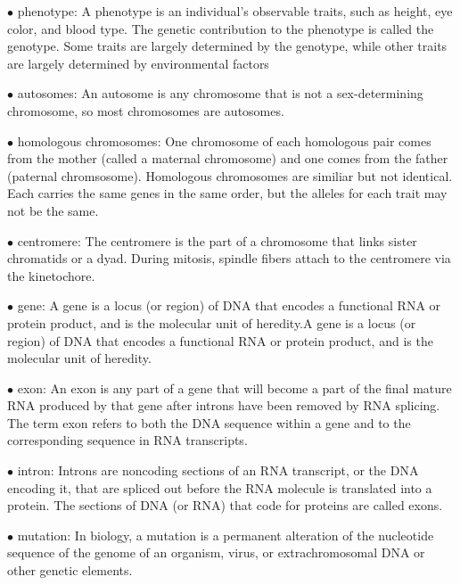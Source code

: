 \documentclass{article}
\begin{document}
\vspace{0.1in}
$\bullet$ phenotype:
A phenotype is an individual's observable traits, such as height, eye color, and blood type. The genetic contribution to the phenotype is called the genotype. Some traits are largely determined by the genotype, while other traits are largely determined by environmental factors

\vspace{0.1in}
$\bullet$ autosomes:
An autosome is any chromosome that is not a sex-determining chromosome, so most chromosomes are autosomes.

\vspace{0.1in}
$\bullet$ homologous chromosomes:
One chromosome of each homologous pair comes from the mother (called a maternal chromosome) and one comes from the father (paternal chromsosome). Homologous chromosomes are similiar but not identical. Each carries the same genes in the same order, but the alleles for each trait may not be the same.

\vspace{0.1in}
$\bullet$ centromere:
The centromere is the part of a chromosome that links sister chromatids or a dyad. During mitosis, spindle fibers attach to the centromere via the kinetochore. 

\vspace{0.1in}
$\bullet$ gene:
A gene is a locus (or region) of DNA that encodes a functional RNA or protein product, and is the molecular unit of heredity.A gene is a locus (or region) of DNA that encodes a functional RNA or protein product, and is the molecular unit of heredity.

\vspace{0.1in}
$\bullet$ exon:
An exon is any part of a gene that will become a part of the final mature RNA produced by that gene after introns have been removed by RNA splicing. The term exon refers to both the DNA sequence within a gene and to the corresponding sequence in RNA transcripts.

\vspace{0.1in}
$\bullet$ intron:
Introns are noncoding sections of an RNA transcript, or the DNA encoding it, that are spliced out before the RNA molecule is translated into a protein. The sections of DNA (or RNA) that code for proteins are called exons.

\vspace{0.1in}
$\bullet$ mutation:
In biology, a mutation is a permanent alteration of the nucleotide sequence of the genome of an organism, virus, or extrachromosomal DNA or other genetic elements.
\end{document}

